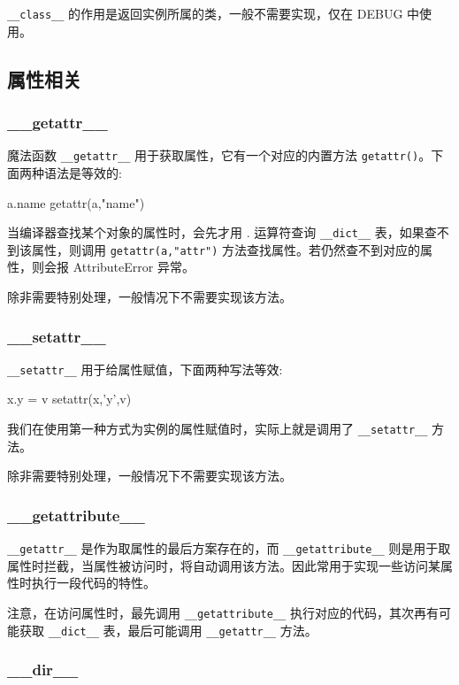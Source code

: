\texttt{\_\_class\_\_} 的作用是返回实例所属的类，一般不需要实现，仅在 DEBUG 中使用。

\subsection{属性相关}
\subsubsection{\_\_getattr\_\_}

魔法函数 \texttt{\_\_getattr\_\_} 用于获取属性，它有一个对应的内置方法 \texttt{getattr()}。下面两种语法是等效的:
\begin{python}
a.name
getattr(a,"name")
\end{python}

当编译器查找某个对象的属性时，会先才用 . 运算符查询 \texttt{\_\_dict\_\_} 表，如果查不到该属性，则调用 \texttt{getattr(a,"attr")} 方法查找属性。若仍然查不到对应的属性，则会报 AttributeError 异常。

除非需要特别处理，一般情况下不需要实现该方法。

\subsubsection{\_\_setattr\_\_}

\texttt{\_\_setattr\_\_} 用于给属性赋值，下面两种写法等效:
\begin{python}
x.y = v
setattr(x,'y',v)
\end{python}

我们在使用第一种方式为实例的属性赋值时，实际上就是调用了 \texttt{\_\_setattr\_\_} 方法。 

除非需要特别处理，一般情况下不需要实现该方法。

\subsubsection{\_\_getattribute\_\_}

\texttt{\_\_getattr\_\_} 是作为取属性的最后方案存在的，而 \texttt{\_\_getattribute\_\_} 则是用于取属性时拦截，当属性被访问时，将自动调用该方法。因此常用于实现一些访问某属性时执行一段代码的特性。

注意，在访问属性时，最先调用 \texttt{\_\_getattribute\_\_} 执行对应的代码，其次再有可能获取 \texttt{\_\_dict\_\_} 表，最后可能调用 \texttt{\_\_getattr\_\_} 方法。 

\subsubsection{\_\_dir\_\_}

